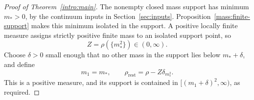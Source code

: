 \begin{proof}[Proof of Theorem~\ref{intro:main}]
The nonempty closed mass support has minimum $m_*>0$, by the continuum
inputs in Section~\ref{sec:inputs}. Proposition~\ref{mass:finite-support}
makes this minimum isolated in the support. A positive locally finite
measure assigns strictly positive finite mass to an isolated support
point, so
\[
 Z=\rho(\{m_*^2\})\in(0,\infty).
\]
Choose $\delta>0$ small enough that no other mass in the support lies
below $m_*+\delta$, and define
\[
 m_1=m_*,\qquad \rho_{\mathrm{rest}}=\rho-Z\delta_{m_*^2}.
\]
This is a positive measure, and its support is contained in
$[(m_1+\delta)^2,\infty)$, as required.
\end{proof}
